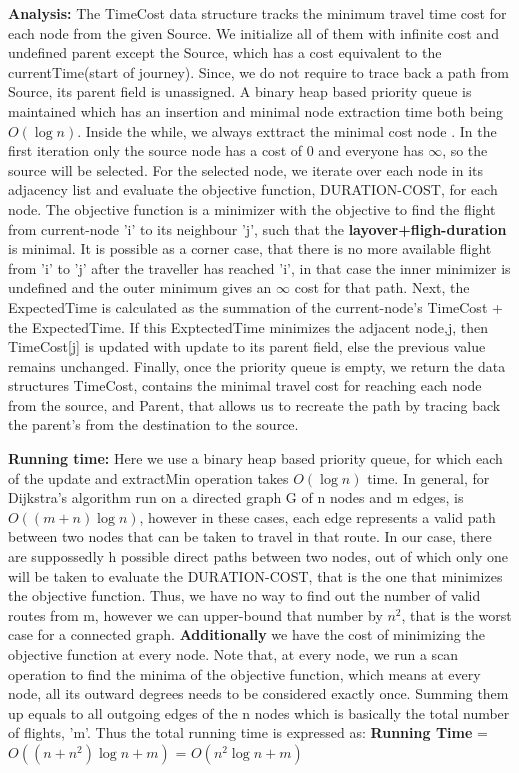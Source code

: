 \documentclass{article}
\newcommand\runtime{\vspace{.10in}\textbf{Running time: }}
\begin{document}
 \textbf {Analysis:} The TimeCost data structure tracks the minimum travel time cost for each node from the given Source. We initialize all of them with infinite cost and undefined parent except the Source, which has a cost equivalent to the currentTime(start of journey). Since, we do not require to trace back a path from Source, its parent field is unassigned. A binary heap based priority queue is maintained which has an insertion and minimal node extraction time both being $O(\log n)$. Inside the while, we always exttract the minimal cost node . In the first iteration only the source node has a cost of 0 and everyone has $\infty$, so the source will be selected. For the selected node, we iterate over each node in its adjacency list and evaluate the objective function, DURATION-COST, for each node. The objective function is a minimizer with the objective to find the flight from current-node 'i' to its neighbour 'j', such that the \textbf {layover+fligh-duration} is minimal. It is possible as a corner case, that there is no more available flight from 'i' to 'j' after the traveller has reached 'i', in that case the inner minimizer is undefined and the outer minimum gives an $\infty$ cost for that path. Next, the ExpectedTime is calculated as the summation of the current-node's TimeCost + the ExpectedTime. If this ExptectedTime minimizes the adjacent node,j, then TimeCost[j] is updated with update to its parent field, else the previous value remains unchanged. Finally, once the priority queue is empty, we return the data structures TimeCost, contains the minimal travel cost for reaching each node from the source, and Parent, that allows us to recreate the path by tracing back the parent's from the destination to the source.

 \runtime Here we use a binary heap based priority queue, for which each of the update and extractMin operation takes $O(\log n)$ time. In general, for  Dijkstra's algorithm run on a directed graph G of n nodes and m edges, is $O((m+n)\log n)$, however in these cases, each edge represents a valid path between two nodes that can be taken to travel in that route. In our case, there are suppossedly h possible direct paths between two nodes, out of which only one will be taken to evaluate the DURATION-COST, that is the one that minimizes the objective function. Thus, we have no way to find out the number of valid routes from m, however we can upper-bound that number by $n^2$, that is the worst case for a connected graph. \textbf {Additionally} we have the cost of minimizing the objective function at every node. Note that, at every node, we run a scan operation to find the minima of the objective function, which means at every node, all its outward degrees needs to be considered exactly once. Summing them up equals to all outgoing edges of the n nodes which is basically the total number of flights, 'm'. Thus the total running time is expressed as: \newline
\textbf {Running Time} = $O((n + n^2)\log n + m)$ = $O(n^2\log n + m)$ \newline
\end{document}
